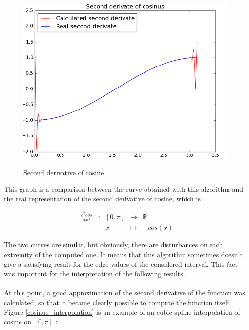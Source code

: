 \documentclass{article}
\begin{document}
\begin{figure}[h]
  \centering
  \caption{Second derivative of cosine}
  \includegraphics[width=11cm]{cosinus_second_derivate}
  \label{cosinus_second_derivate}
\end{figure}

This graph is a comparison between the curve obtained with this algorithm and the real representation of the second derivative of cosine, which is

\begin{equation}
\begin{array}{ccccl}
\frac{d^2 cos}{dx^2} & : & [0, \pi] & \to & \mathbb{R} \\
 & & x & \mapsto & -cos(x)
\end{array}
\end{equation}

The two curves are similar, but obviously, there are disturbances on each extremity of the computed one. It means that this algorithm sometimes doesn't give a satisfying result for the edge values of the considered interval. This fact was important for the interpretation of the following results.\\\\

At this point, a good approximation of the second derivative of the function was calculated, so that it became clearly possible to compute the function itself. Figure \ref{cosinus_interpolation} is an example of an cubic spline interpolation of cosine on $[0, \pi]$ :
\end{document}

